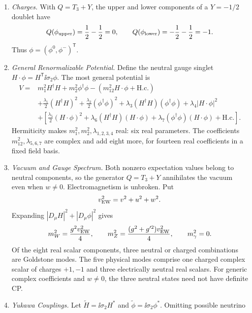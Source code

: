 \begin{enumerate}
  \begin{enumerate}
    \item \emph{Charges.}
    With \(Q=T_3+Y\), the upper and lower components of a
      \(Y=-1/2\) doublet have
      \[
        Q(\phi_{\rm upper})=\frac12-\frac12=0,\qquad
        Q(\phi_{\rm lower})=-\frac12-\frac12=-1.
      \]
      Thus \(\phi=(\phi^0,\phi^-)^{\mathsf T}\).
    \item \emph{General Renormalizable Potential.}
    Define the neutral gauge singlet
      \(H\cdot\phi=H^{\mathsf T}\ii\sigma_2\phi\).  The most general potential is
      \[
      \begin{aligned}
        V={}&m_1^2H^\dagger H+m_2^2\phi^\dagger\phi
          -\left(m_{12}^2H\cdot\phi+\mathrm{H.c.}\right)\\
        &+\frac{\lambda_1}{2}(H^\dagger H)^2
          +\frac{\lambda_2}{2}(\phi^\dagger\phi)^2
          +\lambda_3(H^\dagger H)(\phi^\dagger\phi)
          +\lambda_4|H\cdot\phi|^2\\
        &+\left[
          \frac{\lambda_5}{2}(H\cdot\phi)^2
          +\lambda_6(H^\dagger H)(H\cdot\phi)
          +\lambda_7(\phi^\dagger\phi)(H\cdot\phi)
          +\mathrm{H.c.}\right].
      \end{aligned}
      \]
      Hermiticity makes
      \(m_1^2,m_2^2,\lambda_{1,2,3,4}\) real: six real parameters.
      The coefficients \(m_{12}^2,\lambda_{5,6,7}\) are complex and add
      eight more, for fourteen real coefficients in a fixed field basis.
    \item \emph{Vacuum and Gauge Spectrum.}
    Both nonzero expectation values belong to neutral components, so the
      generator \(Q=T_3+Y\) annihilates the vacuum even when \(w\ne0\).
      Electromagnetism is unbroken.  Put
      \[
        v_{\rm EW}^2=v^2+u^2+w^2.
      \]
      Expanding \(|D_\mu H|^2+|D_\mu\phi|^2\) gives
      \[
        m_W^2=\frac{g^2v_{\rm EW}^2}{4},\qquad
        m_Z^2=\frac{(g^2+g'^2)v_{\rm EW}^2}{4},\qquad
        m_\gamma^2=0.
      \]
      Of the eight real scalar components, three neutral or charged
      combinations are Goldstone modes.  The five physical modes comprise
      one charged complex scalar of charges \(+1,-1\) and three electrically
      neutral real scalars.  For generic complex coefficients and \(w\ne0\),
      the three neutral states need not have definite CP.
    \item \emph{Yukawa Couplings.}
    Let
      \(\widetilde H=\ii\sigma_2H^*\) and
      \(\widetilde\phi=\ii\sigma_2\phi^*\).  Omitting possible neutrino

\end{enumerate}
\end{enumerate}
